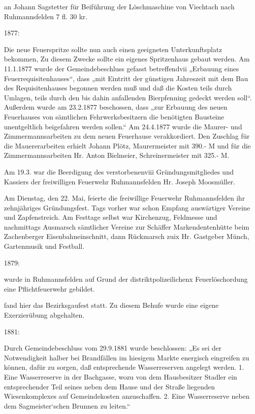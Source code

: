 \documentclass{book}
\begin{document}
an Johann Sagstetter für Beiführung der Löschmaschine von Viechtach nach
Ruhmannsfelden 7 fl. 30 kr.

1877:

Die neue Feuerspritze sollte nun auch einen geeigneten Unterkunftsplatz
bekommen, Zu diesem Zwecke sollte ein eigenes Spritzenhaus gebaut werden. Am
11.1.1877 wurde der Gemeindebeschluss gefasst betreffendvii „Erbauung eines
Feuerrequisitenhauses“, dass „mit Eintritt der günstigen Jahreszeit mit dem Bau
des Requisitenhauses begonnen werden muß und daß die Kosten teils durch Umlagen,
teils durch den bis dahin anfallenden Bierpfenning gedeckt werden soll“.
Außerdem wurde am 23.2.1877 beschossen, dass „zur Erbauung des neuen Feuerhauses
von sämtlichen Fehrwerksbesitzern die benötigten Bausteine unentgeltlich
beigefahren werden sollen.“ Am 24.4.1877 wurde die Maurer- und
Zimmermannsarbeiten zu dem neuen Feuerhause verakkordiert. Den Zuschlag für die
Mauererarbeiten erhielt Johann Plötz, Maurermeister mit 390.- M und für die
Zimmermannsarbeiten Hr. Anton Bielmeier, Schreinermeister mit 325.- M.

Am 19.3. war die Beerdigung des verstorbenenviii Gründungsmitgliedes und
Kassiers der freiwilligen Feuerwehr Ruhmannsfelden Hr. Joseph Moosmüller.

Am Dienstag, den 22. Mai, feierte die freiwillige Feuerwehr Ruhmannsfelden ihr
zehnjähriges Gründungsfest. Tags vorher war schon Empfang auswärtiger Vereine
und Zapfenstreich. Am Festtage selbst war Kirchenzug, Feldmesse und nachmittags
Ausmarsch sämtlicher Vereine zur Schäffer Markendentenhütte beim Zachenberger
Eisenbahneinschnitt, dann Rückmarsch zuix Hr. Gastgeber Münch, Gartenmusik und
Festball.

1879:

wurde in Ruhmannsfelden auf Grund der distriktpolizeilichenx Feuerlöschordung
eine Pflichtfeuerwehr gebildet.

fand hier das Bezirksgaufest statt. Zu diesem Behufe wurde eine eigene
Exerzierübung abgehalten.

1881:

Durch Gemeindebeschluss vom 29.9.1881 wurde beschlossen: „Es sei der
Notwendigkeit halber bei Brandfällen im hiesigem Markte energisch eingreifen zu
können, dafür zu sorgen, daß entsprechende Wasserreserven angelegt werden. 1.
Eine Wasserreserve in der Bachgasse, wozu von dem Hausbesitzer Stadler ein
entsprechender Teil seines neben dem Hause und der Straße liegenden
Wiesenkomplexes auf Gemeindekosten anzuschaffen. 2. Eine Wasserreserve neben dem
Sagmeister`schen Brunnen zu leiten.“
\end{document}
